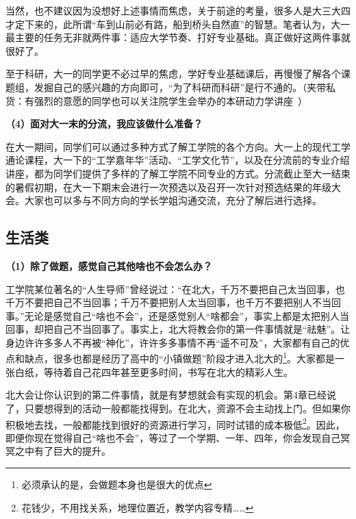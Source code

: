 \documentclass[11pt,oneside]{book}
\begin{document}
\vspace{10pt}

当然，也不建议因为没想好上述事情而焦虑，关于前途的考量，很多人是大三大四才定下来的，此所谓“车到山前必有路，船到桥头自然直”的智慧。笔者认为，大一最主要的任务无非就两件事：适应大学节奏、打好专业基础。真正做好这两件事就很好了。

\vspace{10pt}

至于科研，大一的同学更不必过早的焦虑，学好专业基础课后，再慢慢了解各个课题组，发掘自己的感兴趣的方向即可，“为了科研而科研”是行不通的。（夹带私货：有强烈的意愿的同学也可以关注院学生会举办的本研动力学讲座~）

\textbf{（4）面对大一末的分流，我应该做什么准备？}

在大一期间，同学们可以通过多种方式了解工学院的各个方向。大一上的现代工学通论课程，大一下的“工学嘉年华”活动、“工学文化节”，以及在分流前的专业介绍讲座，都为同学们提供了多样的了解工学院不同专业的方式。分流截止至大一结束的暑假初期，在大一下期末会进行一次预选以及召开一次针对预选结果的年级大会。大家也可以多与不同方向的学长学姐沟通交流，充分了解后进行选择。

\subsection{生活类}
\textbf{（1）除了做题，感觉自己其他啥也不会怎么办？}

\vspace{10pt}

工学院某位著名的“人生导师”曾经说过：“在北大，千万不要把自己太当回事，也千万不要把自己不当回事；千万不要把别人太当回事，也千万不要把别人不当回事。”无论是感觉自己“啥也不会”，还是感觉别人“啥都会”，事实上都是太把别人当回事，却把自己不当回事了。事实上，北大将教会你的第一件事情就是“祛魅”。让身边许许多多人不再被“神化”，许许多多事情不再“遥不可及”，大家都有自己的优点和缺点，很多也都是经历了高中的“小镇做题”阶段才进入北大的\footnote{必须承认的是，会做题本身也是很大的优点}。大家都是一张白纸，等待着自己花四年甚至更多时间，书写在北大的精彩人生。

\vspace{10pt}

北大会让你认识到的第二件事情，就是有梦想就会有实现的机会。第4章已经说了，只要想得到的活动一般都能找得到。在北大，资源不会主动找上门。但如果你积极地去找，一般都能找到很好的资源进行学习，同时试错的成本极低\footnote{花钱少，不用找关系，地理位置近，教学内容专精……}。因此，即便你现在觉得自己“啥也不会”，等过了一个学期、一年、四年，你会发现自己冥冥之中有了巨大的提升。
\end{document}
